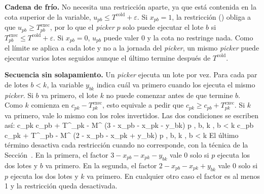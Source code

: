 {\bf Cadena de frío.} No necesita una restricción aparte, ya que está contenida
en la cota superior de la variable, $u_{pb} \leq T^{\text{cold}} + \varepsilon$.
Si $x_{pb} = 1$, la restricción () obliga a que
$u_{pb} \geq T^{\text{exec}}_{pb}$, por lo que el {\em picker} $p$ solo
puede ejecutar el lote $b$ si
$T^{\text{exec}}_{pb} \leq T^{\text{cold}} + \varepsilon$.
Si $x_{pb} = 0$, $u_{pb}$ puede valer 0 y la cota no restringe nada. Como el
límite se aplica a cada lote y no a la jornada del {\em picker}, un mismo
{\em picker} puede ejecutar varios lotes seguidos aunque el último termine
después de $T^{\text{cold}}$.

{\bf Secuencia sin solapamiento.} Un {\em picker} ejecuta un lote por vez.
Para cada par de lotes $b < k$, la variable $y_{bk}$ indica cuál va primero
cuando los ejecuta el mismo {\em picker}. Si $b$ va primero, el lote $k$ no
puede comenzar antes de que termine $b$. Como $k$ comienza en
$c_{pk} - T^{\text{exec}}_{pk}$, esto equivale a pedir que
$c_{pk} \geq c_{pb} + T^{\text{exec}}_{pk}$. Si $k$ va primero, vale lo mismo
con los roles invertidos. Las dos condiciones se escriben así:
\startplaceformula
\startformula
	\startalign[n=3, align={right,left,left}]
		\NC \NC c_{pk} \geq c_{pb} + T^{}_{pk} - M^{} (3 - x_{pb} - x_{pk} - y_{bk}) \NC \quad \forall p \in {},\; b, k \in {},\; b < k 
		\NC \NC c_{pb} \geq c_{pk} + T^{}_{pb} - M^{} (2 - x_{pb} - x_{pk} + y_{bk}) \NC \quad \forall p \in {},\; b, k \in {},\; b < k 
	\stopalign
\stopformula
\stopplaceformula
El último término desactiva cada restricción cuando no corresponde, con la
técnica de la Sección~. En la primera, el factor
$3 - x_{pb} - x_{pk} - y_{bk}$ vale 0 solo si $p$ ejecuta los dos lotes y $b$
va primero. En la segunda, el factor $2 - x_{pb} - x_{pk} + y_{bk}$ vale 0
solo si $p$ ejecuta los dos lotes y $k$ va primero. En cualquier otro caso el
factor es al menos 1 y la restricción queda desactivada.


